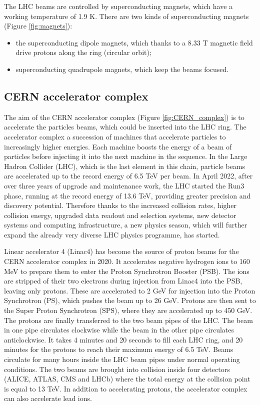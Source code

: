 \documentclass[a4paper, oneside, 11pt, openright]{book}
\begin{document}
				The LHC beams are controlled by superconducting magnets, which have a working temperature of 1.9 K. There are two kinds of superconducting magnets (Figure \ref{fig:magnets}):
				\begin{itemize}
					\item the superconducting dipole magnets, which thanks to a 8.33 T magnetic field drive protons along the ring (circular orbit);
					\item superconducting quadrupole magnets, which keep the beams focused.
				\end{itemize} 
					
			\subsection{CERN accelerator complex}
				The aim of the CERN accelerator complex (Figure \ref{fig:CERN_complex}) is to accelerate the particles beams, which could be inserted into the LHC ring. The accelerator complex a succession of machines that accelerate particles to increasingly higher energies. Each machine boosts the energy of a beam of particles before injecting it into the next machine in the sequence. In the Large Hadron Collider (LHC), which is the last element in this chain, particle beams are accelerated up to the record energy of 6.5 TeV per beam. In April 2022, after over three years of upgrade and maintenance work, the LHC started the Run3 phase, running at the record energy of 13.6 TeV, providing greater precision and discovery potential. Therefore thanks to the increased collision rates, higher collision energy, upgraded data readout and selection systems, new detector systems and computing infrastructure, a new physics season, which will further expand the already very diverse LHC physics programme, has started.
				
				Linear accelerator 4 (Linac4) has become the source of proton beams for the CERN accelerator complex in 2020. It accelerates negative hydrogen ions to 160 MeV to prepare them to enter the Proton Synchrotron Booster (PSB). The ions are stripped of their two electrons during injection from Linac4 into the PSB, leaving only protons. These are accelerated to 2 GeV for injection into the Proton Synchrotron (PS), which pushes the beam up to 26 GeV. Protons are then sent to the Super Proton Synchrotron (SPS), where they are accelerated up to 450 GeV. The protons are finally transferred to the two beam pipes of the LHC. The beam in one pipe circulates clockwise while the beam in the other pipe circulates anticlockwise. It takes 4 minutes and 20 seconds to fill each LHC ring, and 20 minutes for the protons to reach their maximum energy of 6.5 TeV. Beams circulate for many hours inside the LHC beam pipes under normal operating conditions. The two beams are brought into collision inside four detectors (ALICE, ATLAS, CMS and LHCb) where the total energy at the collision point is equal to 13 TeV. In addition to accelerating protons, the accelerator complex can also accelerate lead ions.
				
\end{document}
